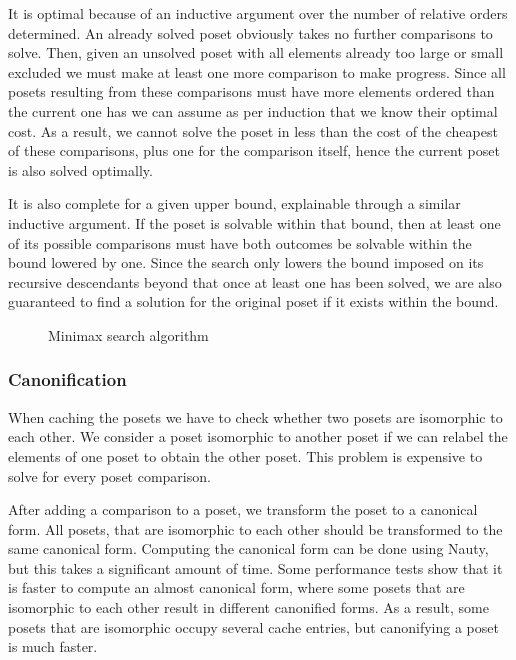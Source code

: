 \documentclass[10pt,journal,compsoc]{IEEEtran}
\begin{document}
It is optimal because of an inductive argument over the number of relative orders determined.
An already solved poset obviously takes no further comparisons to solve.
Then, given an unsolved poset with all elements already too large or small excluded we must make at least one more comparison to
make progress.
Since all posets resulting from these comparisons must have more elements ordered than the current one has we can assume as per induction that we know their optimal cost.
As a result, we cannot solve the poset in less than the cost of the cheapest of these comparisons, plus one for the comparison itself, hence the current poset is also solved optimally.

It is also complete for a given upper bound, explainable through a similar inductive argument.
If the poset is solvable within that bound, then at least one of its possible comparisons must have both outcomes be solvable within the bound lowered by one.
Since the search only lowers the bound imposed on its recursive descendants beyond that once at least one has been solved, we are also guaranteed to find a solution for the original poset if it exists within the bound.

\begin{figure}[!b]
  \centering
  
  \caption{Minimax search algorithm}
  \label{fig:minimax_search}
\end{figure}

\subsubsection{Canonification}

When caching the posets we have to check whether two posets are isomorphic to each other.
We consider a poset isomorphic to another poset if we can relabel the elements of one poset to obtain the other poset.
This problem is expensive to solve for every poset comparison.

After adding a comparison to a poset, we transform the poset to a canonical form.
All posets, that are isomorphic to each other should be transformed to the same canonical form.
Computing the canonical form can be done using Nauty, but this takes a significant amount of time.
Some performance tests show that it is faster to compute an almost canonical form, where some posets that are isomorphic to each other result in different canonified forms.
As a result, some posets that are isomorphic occupy several cache entries, but canonifying a poset is much faster.
\end{document}

